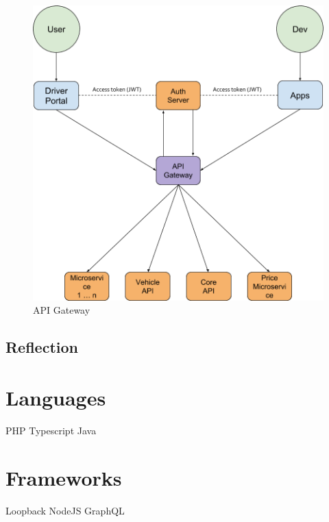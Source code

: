 \begin{figure}[H]
	\centering
	\includegraphics[width=.7\textwidth]{Auth3}
	\caption[API Gateway]{API Gateway}
	\label{fig:Auth3}
\end{figure}

\subsection{Reflection}

%
\section{Languages}
PHP
Typescript
Java

%
\section{Frameworks}
Loopback
NodeJS
GraphQL

